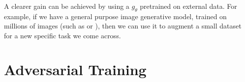 A clearer gain can be achieved by using a $g_{\theta}$ pretrained on external data. For example, if we have a general purpose image generative model, trained on millions of images (such as \cite{ramesh2022hierarchical} or \cite{rombach2022high}), then we can use it to augment a small dataset for a new specific task we come across. %





\section{Adversarial Training}

